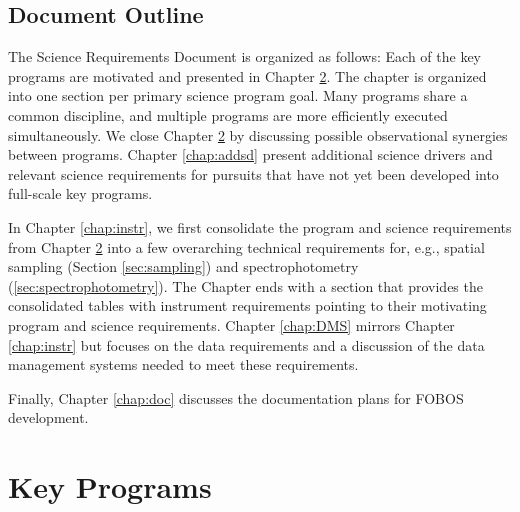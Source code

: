 \documentclass[11pt,a4paper,twoside,onecolumn,openany,final,oldfontcommands]{memoir}
\begin{document}
\section{Document Outline}

The Science Requirements Document is organized as follows:  Each of the key programs are motivated and presented in Chapter \ref{chap:key}.  The chapter is organized into one section per primary science program goal.  Many programs share a common discipline, and multiple programs are more efficiently executed simultaneously.  We close Chapter \ref{chap:key} by discussing possible observational synergies between programs. Chapter \ref{chap:addsd} present additional science drivers and relevant science requirements for pursuits that have not yet been developed into full-scale key programs.


In Chapter \ref{chap:instr}, we first consolidate the program and science requirements from Chapter \ref{chap:key} into a few overarching technical requirements for, e.g., spatial sampling (Section \ref{sec:sampling}) and spectrophotometry (\ref{sec:spectrophotometry}). The Chapter ends with a section that provides the consolidated tables with instrument requirements pointing to their motivating program and science requirements. Chapter \ref{chap:DMS} mirrors Chapter \ref{chap:instr} but focuses on the data requirements and a discussion of the data management systems needed to meet these requirements.

Finally, Chapter \ref{chap:doc} discusses the documentation plans for FOBOS development.

\newpage

\chapter{Key Programs}
\label{chap:key}


\end{document}
